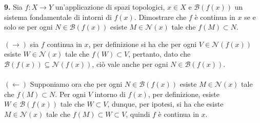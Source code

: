\documentclass[oneside, 11pt]{amsbook}
\makeatletter
\newcommand{\0}{{(0)}}
\newcommand{\3}{{(3)}}
\theoremstyle{colonplain}
\theoremstyle{colondefinition}
\theoremstyle{colonremark}
\numberwithin{equation}{chapter}
\renewcommand{\proofname}{Dimostrazione}
\renewenvironment{proof}[1][\proofname]{\par
  \pushQED{\qed}%
  \normalfont \topsep6\p@\@plus6\p@\relax
  \trivlist
  \item[\hskip\labelsep\bfseries #1:]\ignorespaces
}{%
  \popQED\endtrivlist\@endpefalse
}
\makeatother
\begin{document}
\textbf{9.} Sia $f : X \longrightarrow Y$ un'applicazione di spazi topologici, $x \in X$ e $\mathcal{B}(f(x))$ un sistema fondamentale di intorni di $f(x)$. Dimostrare che $f$ è continua in $x$ se e solo se per ogni $N \in \mathcal{B}(f(x))$ esiste $M \in \mathcal{N}(x)$ tale che $f(M) \subset N$.
\begin{proof} $(\rightarrow)$ sia $f$ continua in $x$, per definizione si ha che per ogni $V \in \mathcal{N}(f(x))$ esiste $W \in \mathcal{N}(x)$ tale che $f(W) \subset V$, pertanto, dato che $\mathcal{B}(f(x)) \subseteq \mathcal{N}(f(x))$, ciò vale anche per ogni $N \in \mathcal{B}(f(x))$. \\ \\
$(\leftarrow)$ Supponiamo ora che per ogni $N \in \mathcal{B}(f(x))$ esiste $M \in \mathcal{N}(x)$ tale che $f(M) \subset N$. Per ogni $V$ intorno di $f(x)$, per definizione, esiste $W \in \mathcal{B}(f(x))$ tale che $W \subset V$, dunque, per ipotesi, si ha che esiste $M \in \mathcal{N}(x)$ tale che $f(M) \subset W \subset V$, quindi $f$ è continua in $x$.
\end{proof}
\end{document}
